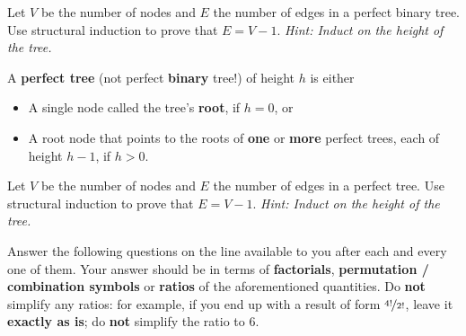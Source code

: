 \documentclass[letterpaper,12pt]{article}
\begin{document}
Let $V$ be the number of nodes and $E$ the number of edges in a perfect binary tree.  Use structural induction to prove that $E=V - 1$.  \textit{Hint: Induct on the height of the tree.}

\standardinductionspace


A {\bf perfect tree} (not perfect {\bf binary} tree!) of height $h$ is either

\begin{itemize}
	\item A single node called the tree's \textbf{root}, if $h=0$, or 
	\item A root node that points to the roots of \textbf{one} or \textbf{more} perfect trees, each of height $h - 1$, if $h>0$.
\end{itemize}

Let $V$ be the number of nodes and $E$ the number of edges in a perfect tree.  Use structural induction to prove that $E=V - 1$.  \textit{Hint: Induct on the height of the tree.}

\standardinductionspace


\newcommand{\lineitem}[1]{\item #1 \null \hfill \myline{1in}}

Answer the following questions on the line available to you after each and 
every one of them. Your answer should be in terms of {\bf factorials}, {\bf permutation / combination symbols} or {\bf ratios} of the aforementioned quantities. Do {\bf not} simplify any ratios: for example, if you end up with a result of form $\nicefrac{4!}{2!}$, leave it {\bf exactly as is}; do {\bf not} simplify the ratio to $6$.
\end{document}
